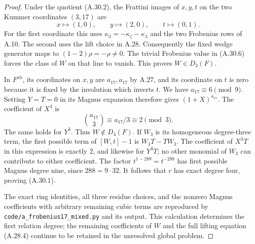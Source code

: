 \begin{proof}
Under the quotient (A.30.2), the
Frattini images of $x,y,t$ on
the two Kummer coordinates
$(3,17)$ are
\[
 x\longmapsto(1,0),\qquad
 y\longmapsto(2,0),\qquad
 t\longmapsto(0,1).
 \tag{A.30.7}
\]
For the first coordinate this
uses $\kappa_3=-\kappa_\zeta-
\kappa_\lambda$ and the two
Frobenius rows of A.10. The
second uses the lift choice
in A.28. Consequently the
fixed wedge generator maps
to $(1-2)\rho=-\rho\ne0$.
The trivial Frobenius value
in (A.30.6) forces the class
of $W$ on that line to vanish.
This proves $W\in D_3(F)$.

In $F^{\mathrm{ab}}$, its
coordinates on $x,y$ are
$a_{17},a_{17}$ by A.27,
and its coordinate on $t$
is zero because it is fixed
by the involution which
inverts $t$. We have
$a_{17}\equiv6\pmod9$.
Setting $Y=T=0$ in its
Magnus expansion therefore
gives $(1+X)^{a_{17}}$.
The coefficient of $X^3$ is
\[
 \binom{a_{17}}3
       \equiv a_{17}/3\equiv2\pmod3.
\]
The same holds for $Y^3$.
Thus $W\notin D_4(F)$.
If $W_3$ is its homogeneous
degree-three term, the first
possible term of $[W,t]-1$
is $W_3T-TW_3$. The coefficient
of $X^3T$ in this expression
is exactly $2$, and likewise
for $Y^3T$; no other monomial
of $W_3$ can contribute to
either coefficient. The factor
$t^{1-289}=t^{-288}$ has first
possible Magnus degree nine,
since $288=9\cdot32$.
It follows that $r$ has exact
degree four, proving (A.30.1).

The exact ring identities,
all three residue choices,
and the nonzero Magnus
coefficients with arbitrary
remaining cubic terms are
reproduced by
\texttt{code/a\_frobenius17\_mixed.py}
and its output. This calculation
determines the first relation
degree; the remaining coefficients
of $W$ and the full lifting
equation (A.28.4) continue to
be retained in the unresolved
global problem.
\end{proof}

